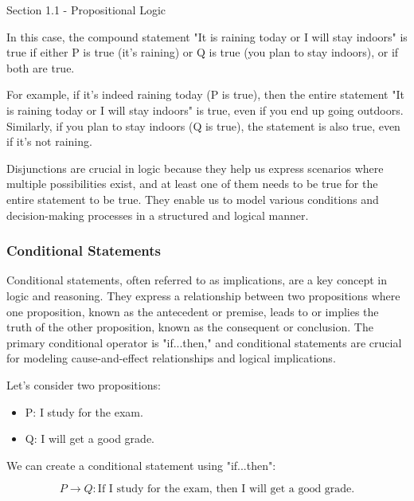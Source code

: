 \begin{notes}{Section 1.1 - Propositional Logic}
\begin{Highlight}
        In this case, the compound statement "It is raining today or I will stay indoors" is true if either P is true (it's raining) or Q is true (you plan to stay indoors), or if both are true.

        For example, if it's indeed raining today (P is true), then the entire statement "It is raining today or I will stay indoors" is true, even if you end up going outdoors. Similarly, if you plan to stay 
        indoors (Q is true), the statement is also true, even if it's not raining.
    \end{Highlight}

    Disjunctions are crucial in logic because they help us express scenarios where multiple possibilities exist, and at least one of them needs to be true for the entire statement to be true. They enable us to 
    model various conditions and decision-making processes in a structured and logical manner.

    \subsubsection*{Conditional Statements}

    Conditional statements, often referred to as implications, are a key concept in logic and reasoning. They express a relationship between two propositions where one proposition, known as the antecedent or premise, 
    leads to or implies the truth of the other proposition, known as the consequent or conclusion. The primary conditional operator is "if...then," and conditional statements are crucial for modeling cause-and-effect 
    relationships and logical implications.

    \begin{Highlight}
        Let's consider two propositions:

        \begin{itemize}
            \item P: I study for the exam.
            \item Q: I will get a good grade.
        \end{itemize}

        We can create a conditional statement using "if...then":

        \begin{equation}
            P \rightarrow Q: \text{If I study for the exam, then I will get a good grade.}
        \end{equation}


\end{Highlight}
\end{notes}
